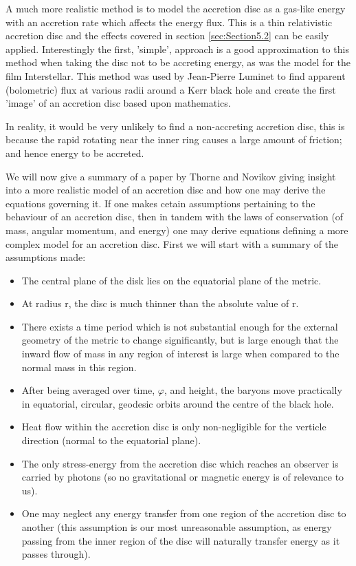 \documentclass[oneside,openright,frontopenright, singlespacing]{dmathesis}
\begin{document}
\vspace{1em}
	A much more realistic method is to model the accretion disc as a gas-like energy with an accretion rate which affects the energy flux. This is a thin relativistic accretion disc and the effects covered in section \ref{sec:Section5.2} can be easily applied. Interestingly the first, 'simple', approach is a good approximation to this method when taking the disc not to be accreting energy, as was the model for the film Interstellar. This method was used by Jean-Pierre Luminet to find apparent (bolometric) flux at various radii around a Kerr black hole and create the first 'image' of an accretion disc based upon mathematics.

\vspace{1em}
	In reality, it would be very unlikely to find a non-accreting accretion disc, this is because the rapid rotating near the inner ring causes a large amount of friction; and hence energy to be accreted.

\vspace{1em}
	We will now give a summary of a paper by Thorne and Novikov\cite{novikov1973astrophyics} giving insight into a more realistic model of an accretion disc and how one may derive the equations governing it. If one makes cetain assumptions pertaining to the behaviour of an accretion disc, then in tandem with the laws of conservation (of mass, angular momentum, and energy) one may derive equations defining a more complex model for an accretion disc. First we will start with a summary of the assumptions made:

\vspace{1em}
\begin{itemize}
	\item The central plane of the disk lies on the equatorial plane of the metric.
	\item At radius r, the disc is much thinner than the absolute value of r.
	\item There exists a time period which is not substantial enough for the external geometry of the metric to change significantly, but is large enough that the inward flow of mass in any region of interest is large when compared to the normal mass in this region.
	\item After being averaged over time, $\varphi$, and height, the baryons move practically in equatorial, circular, geodesic orbits around the centre of the black hole.
	\item Heat flow within the accretion disc is only non-negligible for the verticle direction (normal to the equatorial plane).
	\item The only stress-energy from the accretion disc which reaches an observer is carried by photons (so no gravitational or magnetic energy is of relevance to us).
	\item One may neglect any energy transfer from one region of the accretion disc to another (this assumption is our most unreasonable assumption, as energy passing from the inner region of the disc will naturally transfer energy as it passes through).
\end{itemize}
\end{document}

